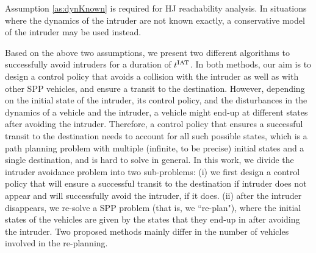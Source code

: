 Assumption \ref{as:dynKnown} is required for HJ reachability analysis. In situations where the dynamics of the intruder are not known exactly, a conservative model of the intruder may be used instead.

Based on the above two assumptions, we present two different algorithms to successfully avoid intruders for a duration of $t^\text{IAT}$. In both methods, our aim is to design a control policy that avoids a collision with the intruder as well as with other SPP vehicles, and ensure a transit to the destination. However, depending on the initial state of the intruder, its control policy, and the disturbances in the dynamics of a vehicle and the intruder, a vehicle might end-up at different states after avoiding the intruder. Therefore, a control policy that ensures a successful transit to the destination needs to account for all such possible states, which is a path planning problem with multiple (infinite, to be precise) initial states and a single destination, and is hard to solve in general. In this work, we divide the intruder avoidance problem into two sub-problems: (i) we first design a control policy that will ensure a successful transit to the destination if intruder does not appear and will successfully avoid the intruder, if it does. (ii) after the intruder disappears, we re-solve a SPP problem (that is, we ``re-plan"), where the initial states of the vehicles are given by the states that they end-up in after avoiding the intruder. 
Two proposed methods mainly differ in the number of vehicles involved in the re-planning. 

